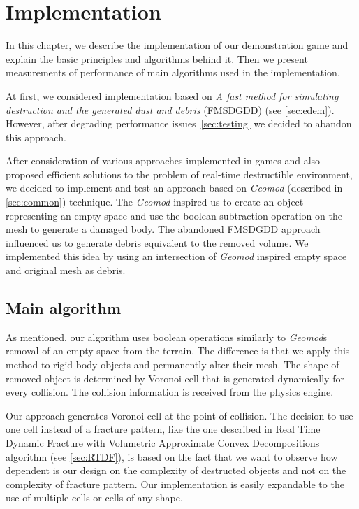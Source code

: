 \chapter{Implementation}
\label{chapt:Implementation}
In this chapter, we describe the implementation of our demonstration game and explain the basic principles and algorithms behind it. Then we present measurements of performance of main algorithms used in the implementation.

At first, we considered implementation based on \emph{A fast method for simulating destruction and the generated dust and debris} (FMSDGDD) (see \cref{sec:edem}). However, after degrading performance issues~\cref{sec:testing} we decided to abandon this approach.

After consideration of various approaches implemented in games and also proposed efficient solutions to the problem of real-time destructible environment, we decided to implement and test an approach based on \emph{Geomod} (described in \cref{sec:common}) technique. The \emph{Geomod} inspired us to create an object representing an empty space and use the boolean subtraction operation on the mesh to generate a damaged body. The abandoned FMSDGDD approach influenced us to generate debris equivalent to the removed volume. We implemented this idea by using an intersection of \emph{Geomod} inspired empty space and original mesh as debris.

\section{Main algorithm}
As mentioned, our algorithm uses boolean operations similarly to \emph{Geomod}s removal of an empty space from the terrain. The difference is that we apply this method to rigid body objects and permanently alter their mesh. The shape of removed object is determined by Voronoi cell that is generated dynamically for every collision. The collision information is received from the physics engine.

Our approach generates Voronoi cell at the point of collision. The decision to use one cell instead of a fracture pattern, like the one described in Real Time Dynamic Fracture with Volumetric Approximate Convex Decompositions algorithm (see \cref{sec:RTDF}), is based on the fact that we want to observe how dependent is our design on the complexity of destructed objects and not on the complexity of fracture pattern. Our implementation is easily expandable to the use of multiple cells or cells of any shape. 

